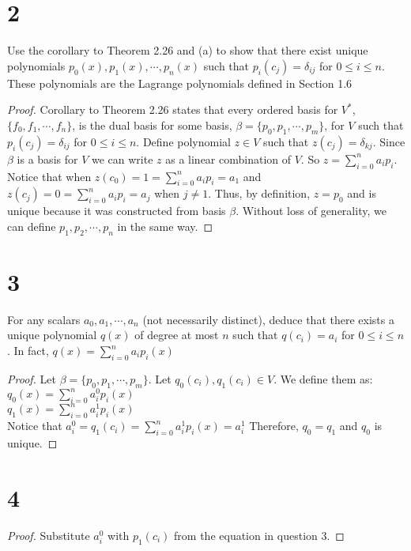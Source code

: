 \documentclass[11pt]{scrartcl}
\begin{document}
\section{2}
Use the corollary to Theorem 2.26 and (a) to show that there exist unique polynomials
$p_0(x), p_1(x), \cdots, p_n(x)$ such that $p_i(c_j) = \delta_{ij}$ for $0 \leq i \leq n$.
These polynomials are the Lagrange polynomials defined in Section 1.6
\begin{proof}
Corollary to Theorem 2.26 states that every ordered basis for $V^*$, $\{f_0, f_1, \cdots, f_n\}$, 
is the dual basis for some basis, $\beta = \{p_0, p_1, \cdots, p_m\}$, for $V$ such that 
$p_i(c_j) = \delta_{ij}$ for $0 \leq i \leq n$. Define polynomial $z \in V$ such that 
$z(c_{j}) = \delta_{kj}$. Since $\beta$ is a basis for $V$ we can write $z$ as a linear
combination of $V$. So $z=\sum_{i=0}^{n}a_ip_i$. Notice that when $z(c_0) = 1 = \sum_{i=0}^{n}a_ip_i = a_1$ and
$z(c_j) = 0 = \sum_{i=0}^{n}a_ip_i = a_j$ when $j \neq 1$. Thus, by definition, $z=p_0$ and is unique because it was
constructed from basis $\beta$. Without loss of generality, we can define $p_1, p_2, \cdots, p_n$ in the same way. 
\end{proof}

\section{3}
For any scalars $a_0, a_1, \cdots, a_n$ (not necessarily distinct), deduce that
there exists a unique polynomial $q(x)$ of degree at most $n$ such that
$q(c_i) = a_i$ for $0 \leq i \leq n$. In fact, $q(x)=\sum_{i=0}^n a_ip_i(x)$

\begin{proof}
Let $\beta = \{p_0, p_1, \cdots, p_m\}$. Let $q_0(c_i), q_1(c_i) \in V$. We define them as:\\
$q_0(x)=\sum_{i=0}^n a^0_ip_i(x)$\\
$q_1(x)=\sum_{i=0}^n a^1_ip_i(x)$\\
Notice that  $a^0_i = q_1(c_i) = \sum_{i=0}^n a^1_ip_i(x) = a^1_i$
Therefore, $q_0 = q_1$ and $q_0$ is unique.
\end{proof}

\section{4}
\begin{proof}
Substitute $a^0_i$ with $p_1(c_i)$ from the equation in question 3.
\end{proof}
\end{document}
